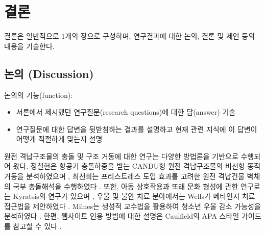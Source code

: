 \chapter{결\quad 론}

결론은 일반적으로 1개의 장으로 구성하며, 연구결과에 대한 논의, 결론 및 제언 등의 내용을 기술한다.

\section{논의 (Discussion)}

논의의 기능(function):
\begin{itemize}[leftmargin=3em, itemsep=2pt]
  \item 서론에서 제시했던 연구질문(research questions)에 대한 답(answer) 기술
  \item 연구질문에 대한 답변을 뒷받침하는 결과를 설명하고 현재 관련 지식에
        이 답변이 어떻게 적절하게 맞는지 설명
\end{itemize}

원전 격납구조물의 충돌 및 구조 거동에 대한 연구는 다양한 방법론을 기반으로 수행되어 왔다. 
정철헌은 항공기 충돌하중을 받는 CANDU형 원전 격납구조물의 비선형 동적거동을 분석하였으며 \cite{jung2002}, 
최선희는 프리스트레스 도입 효과를 고려한 원전 격납건물 벽체의 국부 충돌해석을 수행하였다 \cite{choi2014}. 
또한, 아동 상호작용과 또래 문화 형성에 관한 연구로는 Kyratsis의 연구가 있으며 \cite{kyratsis2004}, 
우울 및 불안 치료 분야에서는 Wells가 메타인지 치료 접근법을 제안하였다 \cite{wells2009a,wells2009b,wells2010}. 
Milnes는 생성적 교수법을 활용하여 청소년 우울 감소 가능성을 분석하였다 \cite{milnes1998}. 
한편, 웹사이트 인용 방법에 대한 설명은 Caulfield의 APA 스타일 가이드를 참고할 수 있다 \cite{caulfield2020}.
